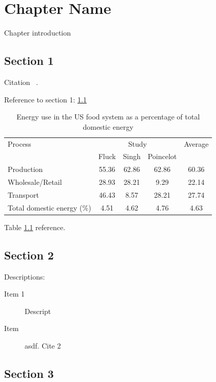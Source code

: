 \chapter{Chapter Name} 

Chapter introduction

\section{Section 1}
\label{sec:sec-1}

Citation ~\cite{s:source1}.

Reference to section 1: \ref{sec:sec-1}

\begin{table}[h]
\centering
\caption{Energy use in the US food system as a percentage of total domestic energy}
\label{tab_agric_energy}
\vspace{6pt}
\begin{tabular}{lcccc}
\toprule
Process & \multicolumn{3}{c}{Study} & Average \\
\cmidrule(r){2-4}
 & Fluck & Singh & Poincelot & \\
\midrule
Production & 55.36  & 62.86 & 62.86 & 60.36 \\
Wholesale/Retail & 28.93    & 28.21 & 9.29  & 22.14 \\
Transport & 46.43   & 8.57  & 28.21 & 27.74 \\
\midrule
\midrule
Total domestic energy (\%) & 4.51   & 4.62  & 4.76  & 4.63 \\
\bottomrule
\end{tabular}
\end{table}

Table \ref{tab_agric_energy} reference.

\section{Section 2}
\label{sec:sec-2}

Descriptions:

\begin{description}

\item[Item 1]
Descript

\item[Item]
asdf. Cite 2 ~\cite{s:source2}

\end{description}

\section{Section 3}

